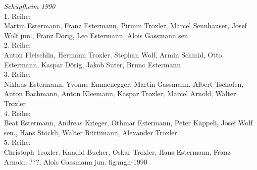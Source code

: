 {\emph{Schüpfheim 1990}\\
    1. Reihe:\\
    Martin Estermann, Franz Estermann, Pirmin Troxler, Marcel Sennhauser, Josef
    Wolf jun., Franz Dörig, Leo Estermann, Alois Gassmann sen.\\
    2. Reihe:\\
    Anton Fleischlin, Hermann Troxler, Stephan Wolf, Armin Schmid, Otto
    Estermann, Kaspar Dörig, Jakob Suter, Bruno Estermann\\
    3. Reihe:\\
    Niklaus Estermann, Yvonne Emmenegger, Martin Gassmann, Albert Tschofen,
    Anton Bachmann, Anton Kleemann, Kaspar Troxler, Marcel Arnold, Walter
    Troxler\\
    4. Reihe:\\
    Beat Estermann, Andreas Krieger, Othmar Estermann, Peter Käppeli, Josef Wolf
    sen., Hans Stöckli, Walter Rüttimann, Alexander Troxler\\
    5. Reihe:\\
    Christoph Troxler, Kandid Bucher, Oskar Troxler, Hans Estermann, Franz
    Arnold, ???, Alois Gassmann jun. } {fig:mgh-1990}


